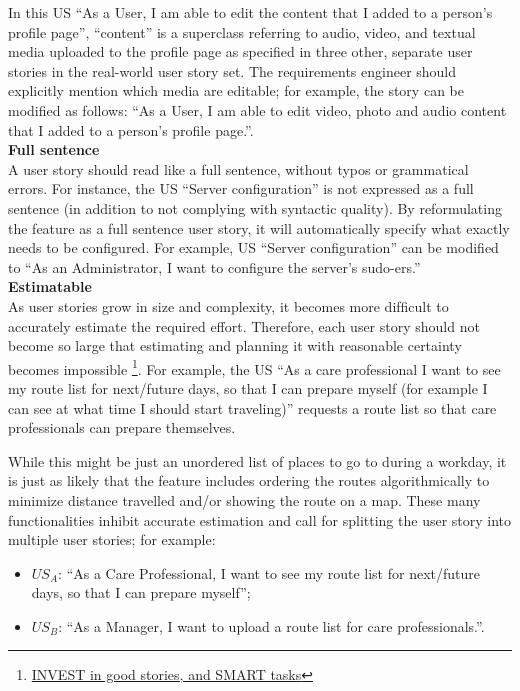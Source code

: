 In this US \enquote{As a User, I am able to edit the content that I added to a person’s proﬁle page}, \enquote{content} is a superclass referring to audio, video, and textual media uploaded to the proﬁle page as speciﬁed in three other, separate user stories in the real-world user story set. The requirements engineer should explicitly mention which media are editable; for example, the story can be modiﬁed as follows: \enquote{As a User, I am able to edit video, photo and audio content that I added to a person’s proﬁle page.}. \\ 
\textbf{Full sentence}\\ 
A user story should read like a full sentence, without typos or grammatical errors. For instance, the US \enquote{Server conﬁguration} is not expressed as a full sentence (in addition to not complying with syntactic quality). By reformulating the feature as a full sentence user story, it will automatically specify what exactly needs to be conﬁgured. For example, US \enquote{Server conﬁguration} can be modiﬁed to \enquote{As an Administrator, I want to conﬁgure the server’s sudo-ers.} \\ 
\textbf{Estimatable}\\ 
As user stories grow in size and complexity, it becomes more difﬁcult to accurately estimate the required effort. Therefore, each user story should not become so large that estimating and planning it with reasonable certainty becomes impossible \footnote{\href{http://xp123.com/articles/invest-in-good-stories-and-smart-tasks/.Accessed 2015-02-18}{INVEST in good stories, and SMART tasks}}. For example, the US \enquote{As a care professional I want to see my route list for next/future days, so that I can prepare myself (for example I can see at what time I should start traveling)} requests a route list so that care professionals can prepare themselves. 

While this might be just an unordered list of places to go to during a workday, it is just as likely that the feature includes ordering the routes algorithmically to minimize distance travelled and/or showing the route on a map. These many functionalities inhibit accurate estimation and call for splitting the user story into multiple user stories; for example:
\begin{itemize}
\item $US_A$: \enquote{As a Care Professional, I want to see my route list for next/future days, so that I can prepare myself};
\item $US_B$: \enquote{As a Manager, I want to upload a route list for care professionals.}.
\end{itemize}

